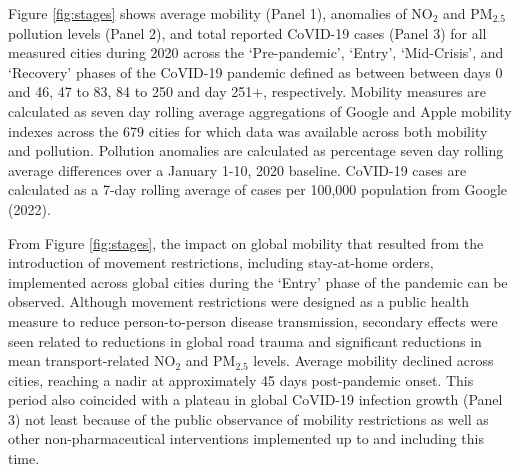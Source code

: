 \documentclass[preprint,10pt]{elsarticle} %
\begin{document}
Figure \ref{fig:stages} shows average mobility (Panel 1), anomalies of NO$_{2}$ and PM$_{2.5}$ pollution levels (Panel 2), and total reported CoVID-19 cases (Panel 3) for all measured cities during 2020 across the `Pre-pandemic', `Entry', `Mid-Crisis', and `Recovery' phases of the CoVID-19 pandemic defined as between between days 0 and 46, 47 to 83, 84 to 250 and day 251+, respectively. Mobility measures are calculated as seven day rolling average aggregations of Google and Apple mobility indexes across the 679 cities for which data was available across both mobility and pollution. Pollution anomalies are calculated as percentage seven day rolling average differences over a January 1-10, 2020 baseline. CoVID-19 cases are calculated as a 7-day rolling average of cases per 100,000 population from Google (2022)\cite{Google2022}.

From Figure \ref{fig:stages}, the impact on global mobility that resulted from the introduction of movement restrictions, including stay-at-home orders, implemented across global cities during the `Entry' phase\cite{hale2021global} of the pandemic can be observed. Although movement restrictions were designed as a public health measure to reduce person-to-person disease transmission, secondary effects were seen related to reductions in global road trauma \cite{ITFRS} and significant reductions in mean transport-related NO$_{2}$ and PM$_{2.5}$ levels\cite{zhang2023impact}. Average mobility declined across cities, reaching a nadir at approximately 45 days post-pandemic onset. This period also coincided with a plateau in global CoVID-19 infection growth (Panel 3) not least because of the public observance of mobility restrictions as well as other non-pharmaceutical interventions implemented up to and including this time\cite{hale2021global}. 
\end{document}
